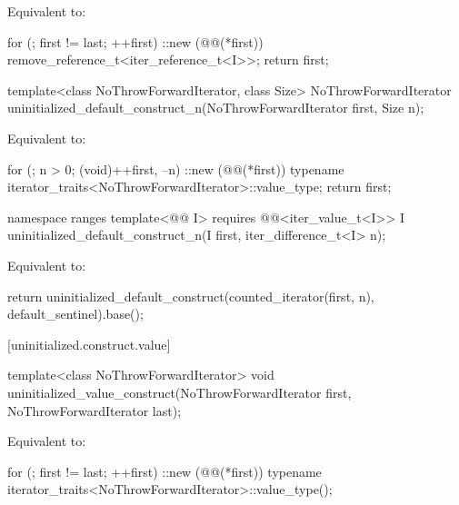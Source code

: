 \begin{itemdescr}
\pnum
\effects
Equivalent to:
\begin{codeblock}
for (; first != last; ++first)
  ::new (@@(*first)) remove_reference_t<iter_reference_t<I>>;
return first;
\end{codeblock}
\end{itemdescr}

%
\begin{itemdecl}
template<class NoThrowForwardIterator, class Size>
  NoThrowForwardIterator uninitialized_default_construct_n(NoThrowForwardIterator first, Size n);
\end{itemdecl}

\begin{itemdescr}
\pnum
\effects
Equivalent to:
\begin{codeblock}
for (; n > 0; (void)++first, --n)
  ::new (@@(*first))
    typename iterator_traits<NoThrowForwardIterator>::value_type;
return first;
\end{codeblock}
\end{itemdescr}

%
\begin{itemdecl}
namespace ranges {
  template<@@ I>
    requires @@<iter_value_t<I>>
    I uninitialized_default_construct_n(I first, iter_difference_t<I> n);
}
\end{itemdecl}

\begin{itemdescr}
\pnum
\effects
Equivalent to:
\begin{codeblock}
return uninitialized_default_construct(counted_iterator(first, n),
                                       default_sentinel).base();
\end{codeblock}
\end{itemdescr}

[uninitialized.construct.value]{}

%
\begin{itemdecl}
template<class NoThrowForwardIterator>
  void uninitialized_value_construct(NoThrowForwardIterator first, NoThrowForwardIterator last);
\end{itemdecl}

\begin{itemdescr}
\pnum
\effects
Equivalent to:
\begin{codeblock}
for (; first != last; ++first)
  ::new (@@(*first))
    typename iterator_traits<NoThrowForwardIterator>::value_type();
\end{codeblock}
\end{itemdescr}

